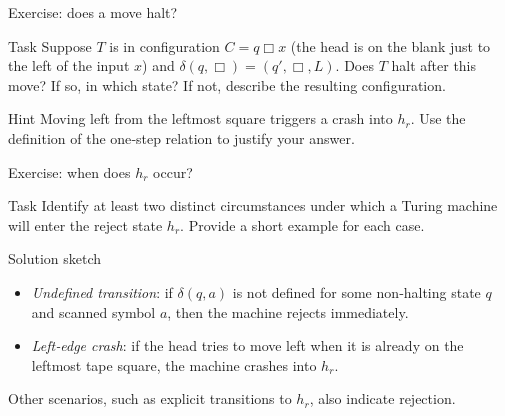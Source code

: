 \begin{frame}[t]{Exercise: does a move halt?}
  \begin{tblock}{Task}
    Suppose $T$ is in configuration $C = q\Box x$ (the head is on the
    blank just to the left of the input $x$) and $\delta(q,\Box) = (q',\Box,L)$.
    Does $T$ halt after this move?  If so, in which state?  If not,
    describe the resulting configuration.
  \end{tblock}
  \begin{talert}{Hint}
    Moving left from the leftmost square triggers a crash into $h_r$.
    Use the definition of the one‑step relation to justify your answer.
  \end{talert}
  \label{fr:7.1-15}
\end{frame}

\begin{frame}[t]{Exercise: when does $h_r$ occur?}
  \begin{tblock}{Task}
    Identify at least two distinct circumstances under which a Turing
    machine will enter the reject state $h_r$.  Provide a short example
    for each case.
  \end{tblock}
  \begin{talert}{Solution sketch}
    \begin{itemize}
      \item \emph{Undefined transition}: if $\delta(q,a)$ is not
        defined for some non‑halting state $q$ and scanned symbol $a$,
        then the machine rejects immediately.
      \item \emph{Left‑edge crash}: if the head tries to move left when
        it is already on the leftmost tape square, the machine crashes
        into $h_r$.
    \end{itemize}
    Other scenarios, such as explicit transitions to $h_r$, also
    indicate rejection.
  \end{talert}
  \label{fr:7.1-16}
\end{frame}

